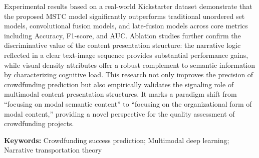 \begin{enabstract}
Experimental results based on a real-world Kickstarter dataset demonstrate that the proposed MSTC model significantly outperforms traditional unordered set models, convolutional fusion models, and late-fusion models across core metrics including Accuracy, F1-score, and AUC. Ablation studies further confirm the discriminative value of the content presentation structure: the narrative logic reflected in a clear text-image sequence provides substantial performance gains, while visual density attributes offer a robust complement to semantic information by characterizing cognitive load. This research not only improves the precision of crowdfunding prediction but also empirically validates the signaling role of multimodal content presentation structures. It marks a paradigm shift from ``focusing on modal semantic content'' to ``focusing on the organizational form of modal content,'' providing a novel perspective for the quality assessment of crowdfunding projects.

\textbf{Keywords:} Crowdfunding success prediction; Multimodal deep learning; Narrative transportation theory
\end{enabstract}
